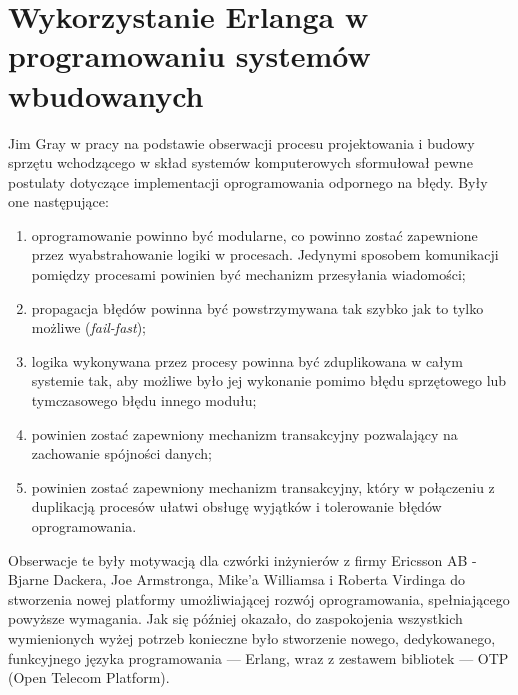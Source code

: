 
\section{Wykorzystanie Erlanga w programowaniu systemów wbudowanych}
\label{sec:jezykiFunkcyjne}

Jim Gray w pracy \cite{Gray85whydo} na podstawie obserwacji procesu projektowania i budowy sprzętu wchodzącego w skład systemów komputerowych sformułował pewne postulaty dotyczące implementacji oprogramowania odpornego na błędy.
Były one następujące:
\begin{enumerate}
\item oprogramowanie powinno być modularne, co powinno zostać zapewnione przez wyabstrahowanie logiki w procesach. Jedynymi sposobem komunikacji pomiędzy procesami powinien być mechanizm przesyłania wiadomości;
\item propagacja błędów powinna być powstrzymywana tak szybko jak to tylko możliwe (\emph{fail-fast});
\item logika wykonywana przez procesy powinna być zduplikowana w całym systemie tak, aby możliwe było jej wykonanie pomimo błędu sprzętowego lub tymczasowego błędu innego modułu;
\item powinien zostać zapewniony mechanizm transakcyjny pozwalający na zachowanie spójności danych;
\item powinien zostać zapewniony mechanizm transakcyjny, który w połączeniu z duplikacją procesów ułatwi obsługę wyjątków i tolerowanie błędów oprogramowania.
\end{enumerate}

Obserwacje te były motywacją dla czwórki inżynierów z firmy Ericsson AB - Bjarne Dackera, Joe Armstronga, Mike'a Williamsa i Roberta Virdinga do stworzenia nowej platformy umożliwiającej rozwój oprogramowania, spełniającego powyższe wymagania.
Jak się później okazało, do zaspokojenia wszystkich wymienionych wyżej potrzeb konieczne było stworzenie nowego, dedykowanego, funkcyjnego języka programowania --- Erlang, wraz z zestawem bibliotek --- OTP (Open Telecom Platform).

